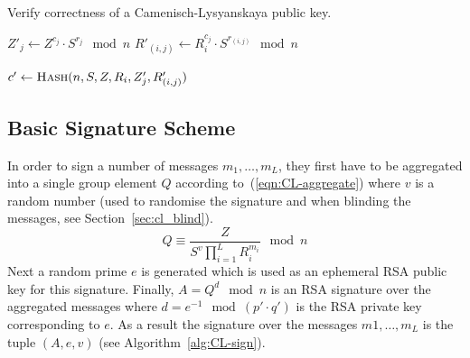 \begin{algorithm}[t]
  \caption{Verify correctness of a Camenisch-Lysyanskaya public key.}
  \label{alg:CL-verify-key}
  \addtolength{\baselineskip}{1mm}
  \begin{algorithmic}[1]
        \State $Z'_j \gets Z^{c_j} \cdot S^{r_j} \mod n$
          \State $R'_{(i,j)} \gets R_i^{c_j} \cdot S^{r_{(i,j)}} \mod n$
        \EndFor
      \EndFor

      \State $c' \gets \Call{Hash}{n, S, Z, R_i, Z'_j, R'_{(i,j)}}$

        \Return {}
      \EndIf

      \Return {}
    \EndFunction
  \end{algorithmic}
\end{algorithm}



\subsection{Basic Signature Scheme}\label{sec:cl_basic}

In order to sign a number of messages $m_1, \dots, m_L$, they first have to be
aggregated into a single group element $Q$ according to~(\ref{eqn:CL-aggregate})
where $v$ is a random number (used to randomise the signature and when blinding
the messages, see Section~\ref{sec:cl_blind}).
\begin{equation}\label{eqn:CL-aggregate}
  Q \equiv \dfrac{Z}{S^v \prod_{i=1}^{L} R_i^{m_i}} \mod n
\end{equation}
Next a random prime $e$ is generated which is used as an ephemeral RSA public
key for this signature. Finally, $A = Q^d \mod n$ is an RSA signature over the
aggregated messages where $d = e^{-1} \mod (p' \cdot q')$ is the RSA private
key corresponding to $e$. As a result the signature over the messages
$m1, \dots, m_L$ is the tuple $(A, e, v)$ (see Algorithm~\ref{alg:CL-sign}).

